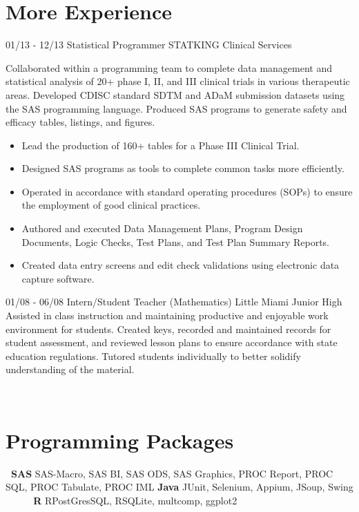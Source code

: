 \documentclass[]{moak-resume}
\begin{document}
\section{More Experience}
\begin{entrylist}
    \entry
    {01/13 - 12/13}
    {Statistical Programmer}
    {STATKING Clinical Services}
    {Collaborated within a programming team to complete data management and statistical analysis of 20+ phase I, II, and III clinical trials in various therapeutic areas. Developed CDISC standard SDTM and ADaM submission datasets using the SAS programming language. Produced SAS programs to generate safety and efficacy tables, listings, and figures.
    	\begin{itemize}
    		\item Lead the production of 160+ tables for a Phase III Clinical Trial.
    		\item Designed SAS programs as tools to complete common tasks more efficiently.
    		\item Operated in accordance with standard operating procedures (SOPs) to ensure the employment of good clinical practices.
    		\item Authored and executed Data Management Plans, Program Design Documents, Logic Checks, Test Plans, and Test Plan Summary Reports.
    		\item Created data entry screens and edit check validations using electronic data capture software.
    	\end{itemize}}
    \entry
    {01/08 - 06/08}
    {Intern/Student Teacher (Mathematics)}
    {Little Miami Junior High}
    {Assisted in class instruction and maintaining productive and enjoyable work environment for students. Created keys, recorded and maintained records for student assessment, and reviewed lesson plans to ensure accordance with state education regulations. Tutored students individually to better solidify understanding of the material.}
\end{entrylist}
\\
 \section{Programming Packages}
 \begin{entrylist}
 	\entry
 	 {\textbf{ SAS}}
 	 {\textnormal{SAS-Macro, SAS BI, SAS ODS, SAS Graphics, PROC Report, PROC SQL, PROC Tabulate, PROC IML}}
 	 {}
 	 {}
 	\entry
 	 {\textbf{Java}}
 	 {\textnormal{JUnit, Selenium, Appium, JSoup, Swing}}
 	 {}
 	 {}
 	\entry
 	 {\textbf{     R}}
 	 {\textnormal{RPostGresSQL, RSQLite, multcomp, ggplot2}}
 	 {}
 	 {}
 \end{entrylist}
\\
\end{document}
